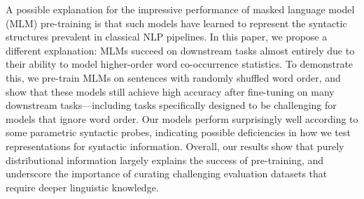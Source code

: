 A possible explanation for the impressive performance of masked language model (MLM) pre-training is that such models have learned to represent the syntactic structures prevalent in classical NLP pipelines. In this paper, we propose a different explanation: MLMs succeed on downstream tasks almost entirely due to their ability to model higher-order word co-occurrence statistics. To demonstrate this, we pre-train MLMs on sentences with randomly shuffled word order, and show that these models still achieve high accuracy after fine-tuning on many downstream tasks---including tasks specifically designed to be challenging for models that ignore word order. Our models perform surprisingly well according to some parametric syntactic probes, indicating possible deficiencies in how we test representations for syntactic information. Overall, our results show that purely distributional information largely explains the success of pre-training, and underscore the importance of curating challenging evaluation datasets that require deeper linguistic knowledge.
